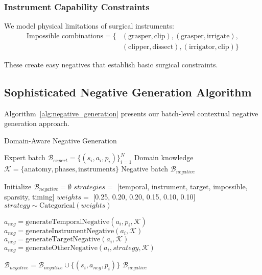 \documentclass[runningheads]{llncs}
\begin{document}
\subsubsection{Instrument Capability Constraints}
We model physical limitations of surgical instruments:
\begin{align}
\text{Impossible combinations} = \{&(\text{grasper}, \text{clip}), (\text{grasper}, \text{irrigate}), \\
&(\text{clipper}, \text{dissect}), (\text{irrigator}, \text{clip})\}
\end{align}

These create easy negatives that establish basic surgical constraints.

\subsection{Sophisticated Negative Generation Algorithm}

Algorithm~\ref{alg:negative_generation} presents our batch-level contextual negative generation approach.

\begin{algorithm}
\caption{Domain-Aware Negative Generation}
\label{alg:negative_generation}
\begin{algorithmic}[1]
\REQUIRE Expert batch $\mathcal{B}_{expert} = \{(s_i, a_i, p_i)\}_{i=1}^N$
\REQUIRE Domain knowledge $\mathcal{K} = \{\text{anatomy}, \text{phases}, \text{instruments}\}$
\ENSURE Negative batch $\mathcal{B}_{negative}$

\STATE Initialize $\mathcal{B}_{negative} = \emptyset$
    \STATE $strategies = $ [temporal, instrument, target, impossible, sparsity, timing]
    \STATE $weights = $ [0.25, 0.20, 0.20, 0.15, 0.10, 0.10]
    \STATE $strategy \sim \text{Categorical}(weights)$
    
        \STATE $a_{neg} = \text{generateTemporalNegative}(a_i, p_i, \mathcal{K})$
        \STATE $a_{neg} = \text{generateInstrumentNegative}(a_i, \mathcal{K})$
        \STATE $a_{neg} = \text{generateTargetNegative}(a_i, \mathcal{K})$
    \ELSE
        \STATE $a_{neg} = \text{generateOtherNegative}(a_i, strategy, \mathcal{K})$
    \ENDIF
    
    \STATE $\mathcal{B}_{negative} = \mathcal{B}_{negative} \cup \{(s_i, a_{neg}, p_i)\}$
\ENDFOR
\RETURN $\mathcal{B}_{negative}$
\end{algorithmic}
\end{algorithm}
\end{document}
